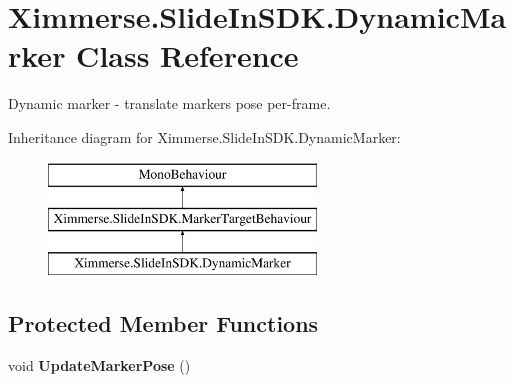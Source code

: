 \hypertarget{class_ximmerse_1_1_slide_in_s_d_k_1_1_dynamic_marker}{}\section{Ximmerse.\+Slide\+In\+S\+D\+K.\+Dynamic\+Marker Class Reference}
\label{class_ximmerse_1_1_slide_in_s_d_k_1_1_dynamic_marker}


Dynamic marker -\/ translate marker\textquotesingle{}s pose per-\/frame. ~\newline
 


Inheritance diagram for Ximmerse.\+Slide\+In\+S\+D\+K.\+Dynamic\+Marker\+:\begin{figure}[H]
\begin{center}
\leavevmode
\includegraphics[height=3.000000cm]{class_ximmerse_1_1_slide_in_s_d_k_1_1_dynamic_marker}
\end{center}
\end{figure}
\subsection*{Protected Member Functions}
\begin{DoxyCompactItemize}
\item 
\mbox{\label{class_ximmerse_1_1_slide_in_s_d_k_1_1_dynamic_marker_a90627f287fcfc954151725663a5fbeb3}} 
void {\bfseries Update\+Marker\+Pose} ()
\end{DoxyCompactItemize}
